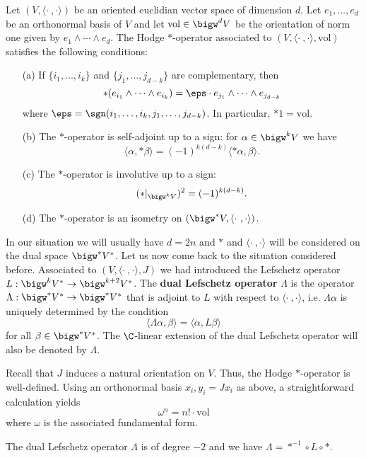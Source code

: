 \begin{proposition}\label{almost complex space Hodge star operator prop}
Let $(V,\langle\cdot\ ,\cdot\rangle)$ be an oriented euclidian vector space of dimension $d$. Let $e_1,\dots,e_d$ be an orthonormal basis of $V$ and let $\mathrm{vol}\in\bigw^dV$ be the orientation of norm one given by $e_1\wedge\cdots\wedge e_d$. The Hodge $\ast$-operator associated to $(V,\langle\cdot\ ,\cdot\rangle,\mathrm{vol})$ satisfies the following conditions:
\begin{itemize}
\item[(a)] If $\{i_1,\dots,i_k\}$ and $\{j_1,\dots,j_{d-k}\}$ are complementary, then
\[\ast(e_{i_1}\wedge\cdots\wedge e_{i_k})=\eps\cdot e_{j_1}\wedge\cdots\wedge e_{j_{d-k}}\]
where $\eps=\sgn(i_1,\dots,i_k,j_1,\dots,j_{d-k})$. In particular, $\ast 1=\mathrm{vol}$. 
\item[(b)] The $\ast$-operator is self-adjoint up to a sign: for $\alpha\in\bigw^kV$ we have
\[\langle\alpha,\ast\beta\rangle=(-1)^{k(d-k)}\langle\ast\alpha,\beta\rangle.\] 
\item[(c)] The $\ast$-operator is involutive up to a sign:
\[(\ast|_{\bigw^kV})^2=(-1)^{k(d-k)}.\] 
\item[(d)] The $\ast$-operator is an isometry on $(\bigw^*V,\langle\cdot\ ,\cdot\rangle)$.
\end{itemize}
\end{proposition}
In our situation we will usually have $d=2n$ and $\ast$ and $\langle\cdot\ ,\cdot\rangle$ will be considered on the dual space $\bigw^*V^*$. Let us now come back to the situation considered before. Associated to $(V,\langle\cdot\ ,\cdot\rangle,J)$ we had introduced the Lefschetz operator $L:\bigw^kV^*\to\bigw^{k+2}V^*$. The \textbf{dual Lefschetz operator} $\Lambda$ is the operator $\Lambda:\bigw^*V^*\to\bigw^*V^*$ that is adjoint to $L$ with respect to $\langle\cdot\ ,\cdot\rangle$, i.e. $\Lambda\alpha$ is uniquely determined by the condition
\[\langle\Lambda\alpha,\beta\rangle=\langle\alpha,L\beta\rangle\]
for all $\beta\in\bigw^*V^*$. The $\C$-linear extension of the dual Lefschetz operator will also be denoted by $\Lambda$.
\begin{remark}
Recall that $J$ induces a natural orientation on $V$. Thus, the Hodge $\ast$-operator is well-defined. Using an orthonormal basis $x_i,y_i=Jx_i$ as above, a straightforward calculation yields
\[\omega^n=n!\cdot\mathrm{vol}\]
where $\omega$ is the associated fundamental form.
\end{remark}
\begin{proposition}\label{almost complex space Lefschetz dual operator expression}
The dual Lefschetz operator $\Lambda$ is of degree $-2$ and we have $\Lambda=\ast^{-1}\circ L\circ\ast$.
\end{proposition}
